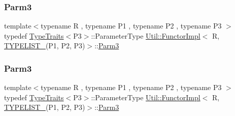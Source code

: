 \subsubsection{\texorpdfstring{Parm3}{Parm3}\hspace{0.1cm}{\footnotesize\ttfamily [1/3]}}
{\footnotesize\ttfamily template$<$typename R , typename P1 , typename P2 , typename P3 $>$ \\
typedef \mbox{\hyperlink{classUtil_1_1TypeTraits}{Type\+Traits}}$<$P3$>$\+::Parameter\+Type \mbox{\hyperlink{classUtil_1_1FunctorImpl}{Util\+::\+Functor\+Impl}}$<$ R, \mbox{\hyperlink{adat__devel__install_2include_2adat_2typelist_8h_a0309f68a543c5c0994f9edc0e56dc59f}{T\+Y\+P\+E\+L\+I\+S\+T\+\_}}(P1, P2, P3)$>$\+::\mbox{\hyperlink{structUtil_1_1Private_1_1FunctorImplBase_a052148e627fd4caecbcffdbdf1033dbb}{Parm3}}}

\mbox{\label{classUtil_1_1FunctorImpl_3_01R_00_01TYPELIST__3_07P1_00_01P2_00_01P3_08_4_a909cd0ef75e4c16e44eb5ae652144d00}} 
\subsubsection{\texorpdfstring{Parm3}{Parm3}\hspace{0.1cm}{\footnotesize\ttfamily [2/3]}}
{\footnotesize\ttfamily template$<$typename R , typename P1 , typename P2 , typename P3 $>$ \\
typedef \mbox{\hyperlink{classUtil_1_1TypeTraits}{Type\+Traits}}$<$P3$>$\+::Parameter\+Type \mbox{\hyperlink{classUtil_1_1FunctorImpl}{Util\+::\+Functor\+Impl}}$<$ R, \mbox{\hyperlink{adat__devel__install_2include_2adat_2typelist_8h_a0309f68a543c5c0994f9edc0e56dc59f}{T\+Y\+P\+E\+L\+I\+S\+T\+\_}}(P1, P2, P3)$>$\+::\mbox{\hyperlink{structUtil_1_1Private_1_1FunctorImplBase_a052148e627fd4caecbcffdbdf1033dbb}{Parm3}}}

\mbox{\label{classUtil_1_1FunctorImpl_3_01R_00_01TYPELIST__3_07P1_00_01P2_00_01P3_08_4_a909cd0ef75e4c16e44eb5ae652144d00}} 
